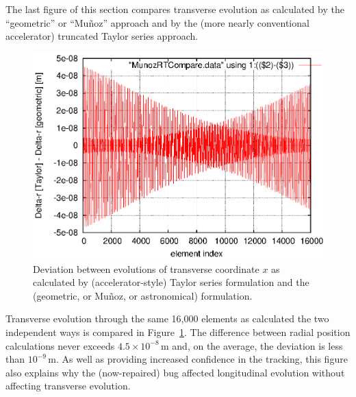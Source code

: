\documentclass[]{article}
\begin{document}
The last figure of this section compares transverse evolution
as calculated by the ``geometric'' or ``Mu\~noz'' approach and
by the (more nearly conventional accelerator) truncated Taylor series
approach. 
%
\begin{figure}[h]
\centering
\includegraphics[scale=0.8]{eps/MunozRT-compare.eps}
\caption{\label{fig:MunozRT-compare}Deviation between evolutions of
transverse coordinate $x$ as calculated by (accelerator-style) 
Taylor series formulation and the (geometric, or Mu\~noz, or 
astronomical) formulation.}
\end{figure}
%
Transverse evolution through the same 16,000 elements as
calculated the two independent ways is compared in 
Figure~\ref{fig:MunozRT-compare}. The difference between
radial position calculations never exceeds 
$4.5\times10^{-8}\,$m and, on the average, the deviation
is less than $10^{-9}\,$m. As well as providing
increased confidence in the tracking, this figure also explains
why the (now-repaired) bug affected longitudinal evolution
without affecting transverse evolution.
\end{document}
